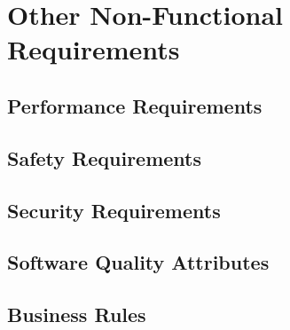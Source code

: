 \section{Other Non-Functional Requirements}
\label{sec:non-functional}

\subsection{Performance Requirements}
\label{sec:performance}

\subsection{Safety Requirements}
\label{sec:safety}

\subsection{Security Requirements}
\label{sec:security}

\subsection{Software Quality Attributes}
\label{sec:quality}

\subsection{Business Rules}
\label{sec:business}

